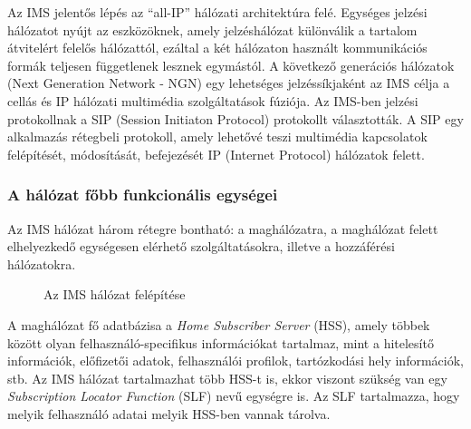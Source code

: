 Az IMS jelentős lépés az ``all-IP'' hálózati architektúra felé. Egységes jelzési hálózatot nyújt az eszközöknek, amely jel\-zés\-há\-ló\-zat különválik a tartalom átvitelért felelős hálózattól, ezáltal a két hálózaton használt kommunikációs formák teljesen függetlenek lesznek egymástól. A következő generációs hálózatok (Next Generation Network - NGN) egy lehetséges jelzéssíkjaként az IMS célja a cellás és IP hálózati multimédia szolgáltatások fúziója. Az IMS-ben jelzési protokollnak a  SIP (Session Initiaton Protocol) protokollt választották. A SIP egy alkalmazás rétegbeli protokoll, amely lehetővé teszi multimédia kapcsolatok felépítését, módosítását, befejezését IP (Internet Protocol) hálózatok felett. 

\subsubsection{A hálózat főbb funkcionális egységei}

Az IMS hálózat három rétegre bontható: a maghálózatra, a maghálózat felett elhelyezkedő egységesen elérhető szolgáltatásokra, illetve a hozzáférési hálózatokra.

\begin{figure}[htbp]
\center
{}
\caption{Az IMS hálózat felépítése~\cite{ims_figure} }
\label{fig:model}
\end{figure}


A maghálózat fő adatbázisa a \emph{Home Subscriber Server} (HSS), amely többek között olyan felhasználó-specifikus információkat tartalmaz, mint a hitelesítő információk, előfizetői adatok, felhasználói profilok, tartózkodási hely információk, stb. Az IMS hálózat tartalmazhat több HSS-t is, ekkor viszont szükség van egy \emph{Subscription Locator Function} (SLF) nevű egységre is. Az SLF tartalmazza, hogy melyik felhasználó adatai melyik HSS-ben vannak tárolva.

